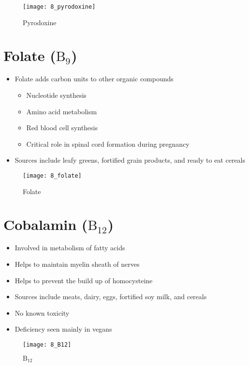 \documentclass[title={Chapter 8}]{fdsn201notes}
\begin{document}
\begin{figure}[H]
	\centering
	\texttt{[image: 8\_pyrodoxine]}
	\caption{Pyrodoxine}
	\label{fig:pyrodoxine}
\end{figure}

\section{Folate ($\mbox{B}_{9}$)}\label{sec:folate}
\begin{itemize}
	\item Folate adds carbon units to other organic compounds
	\begin{itemize}
		\item Nucleotide synthesis
		\item Amino acid metabolism
		\item Red blood cell synthesis
		\item Critical role in spinal cord formation during pregnancy
	\end{itemize}
	\item Sources include leafy greens, fortified grain products, and ready to eat cereals
\end{itemize}

\begin{figure}[H]
	\centering
	\texttt{[image: 8\_folate]}
	\caption{Folate}
	\label{fig:folate}
\end{figure}

\section{Cobalamin ($\mbox{B}_{12}$)}\label{sec:b12}
\begin{itemize}
	\item Involved in metabolism of fatty acids
	\item Helps to maintain myelin sheath of nerves
	\item Helps to prevent the build up of homocysteine
	\item Sources include meats, dairy, eggs, fortified soy milk, and cereals
	\item No known toxicity
	\item Deficiency seen mainly in vegans
\end{itemize}

\begin{figure}[H]
	\centering
	\texttt{[image: 8\_B12]}
	\caption{$\mbox{B}_{12}$}
	\label{fig:B12}
\end{figure}
\end{document}
